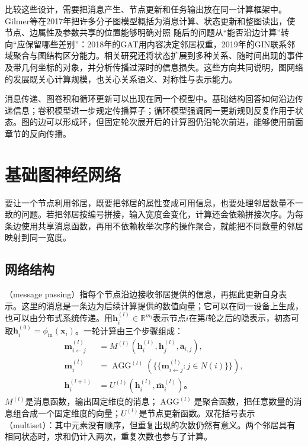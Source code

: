 比较这些设计，需要把消息产生、节点更新和任务输出放在同一计算框架中。Gilmer等在2017年把许多分子图模型概括为消息计算、状态更新和整图读出，使节点、边属性及参数共享的位置能够明确对照 随后的问题从“能否沿边计算”转向“应保留哪些差别”：2018年的GAT用内容决定邻居权重，2019年的GIN联系邻域聚合与图结构区分能力。相关研究还将状态扩展到多种关系、随时间出现的事件及带几何坐标的对象，并分析传播过深时的信息损失。这些方向共同说明，图网络的发展既关心计算规模，也关心关系语义、对称性与表示能力。

消息传递、图卷积和循环更新可以出现在同一个模型中。基础结构回答如何沿边传递信息；卷积模型进一步规定传播算子；循环模型强调同一更新规则反复作用于状态。图的边可以形成环，但固定轮次展开后的计算图仍沿轮次前进，能够使用前面章节的反向传播。

\section{基础图神经网络}
\label{sec:gnn-basic}

要让一个节点利用邻居，既要把邻居的属性变成可用信息，也要处理邻居数量不一致的问题。若把邻居按编号拼接，输入宽度会变化，计算还会依赖拼接次序。为每条边使用共享消息函数，再用不依赖枚举次序的操作聚合，就能把不同数量的邻居映射到同一宽度。

\subsection{网络结构}
\label{sec:gnn-structure}

（message passing）指每个节点沿边接收邻居提供的信息，再据此更新自身表示。这里的消息是一条边为后续计算提供的数值向量；它可以在同一设备上生成，也可以由分布式系统传递。用$\bm{h}_i^{(l)}\in\mathbb{R}^{m_l}$表示节点$i$在第$l$轮之后的隐表示，初态可取$\bm{h}_i^{(0)}=\phi_{\mathrm{in}}(\bm{x}_i)$。一轮计算由三个步骤组成：
\begin{equation}
  \begin{aligned}
    \bm{m}_{i\leftarrow j}^{(l)}
      &=M^{(l)}\!\left(\bm{h}_i^{(l)},\bm{h}_j^{(l)},\bm{a}_{i,j}\right),\\
    \overline{\bm{m}}_i^{(l)}
      &=\operatorname{AGG}^{(l)}
        \!\left(\{\!\{\bm{m}_{i\leftarrow j}^{(l)}:j\in N(i)\}\!\}\right),\\
    \bm{h}_i^{(l+1)}
      &=U^{(l)}\!\left(\bm{h}_i^{(l)},\overline{\bm{m}}_i^{(l)}\right)\text{。}
  \end{aligned}
  \label{eq:gnn-message-passing}
\end{equation}
$M^{(l)}$是消息函数，输出固定维度的消息；$\operatorname{AGG}^{(l)}$是聚合函数，把任意数量的消息组合成一个固定维度的向量；$U^{(l)}$是节点更新函数。双花括号表示（multiset）：其中元素没有顺序，但重复出现的次数仍然有意义。两个邻居具有相同状态时，求和仍计入两次，重复次数也参与了计算。

